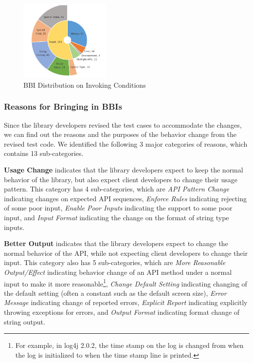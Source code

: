 %
\begin{figure}
	\centering
	\includegraphics[width=0.4\textwidth]{backward/figs/Condition.pdf}
	
	\caption{BBI Distribution on Invoking Conditions}
	
	\label{figure:condition}
	\vspace{0.3cm}
\end{figure}


\subsubsection{Reasons for Bringing in BBIs}

Since the library developers revised the test cases to accommodate the changes, we can find out the reasons and the purposes of the behavior change from the revised test code. We identified the following 3 major categories of reasons, which contains 13 sub-categories. 

\textbf{Usage Change} indicates that the library developers expect to keep the normal behavior of the library, but also expect client developers to change their usage pattern. This category has 4 sub-categories, which are \textit{API Pattern Change} indicating changes on expected API sequences, \textit{Enforce Rules} indicating rejecting of some poor input, \textit{Enable Poor Inputs} indicating the support to some poor input, and \textit{Input Format} indicating the change on the format of string type inputs. 

\textbf{Better Output} indicates that the library developers expect to change the normal behavior of the API, while not expecting client developers to change their input. This category also has 5 sub-categories, which are \textit{More Reasonable Output/Effect} indicating behavior change of an API method under a normal input to make it more reasonable\footnote{For example, in log4j 2.0.2, the time stamp on the log is changed from when the log is initialized to when the time stamp line is printed. }, \textit{Change Default Setting} indicating changing of the default setting (often a constant such as the default screen size), \textit{Error Message} indicating change of reported errors, \textit{Explicit Report} indicating explicitly throwing exceptions for errors, and \textit{Output Format} indicating format change of string output. 

